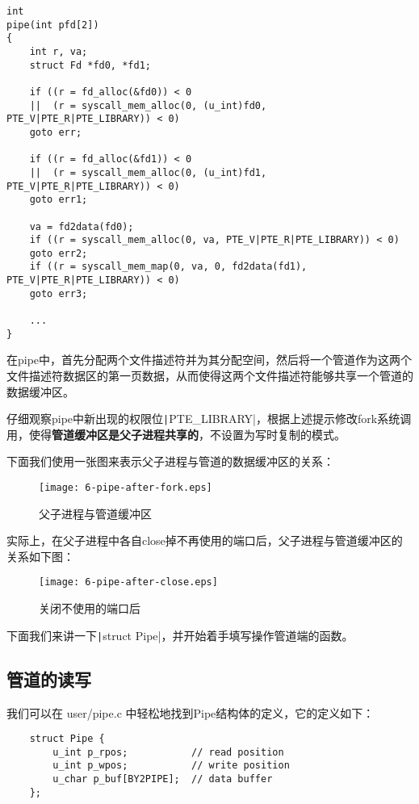 \begin{verbatim}
int
pipe(int pfd[2])
{
	int r, va;
	struct Fd *fd0, *fd1;
	
	if ((r = fd_alloc(&fd0)) < 0
	||  (r = syscall_mem_alloc(0, (u_int)fd0, PTE_V|PTE_R|PTE_LIBRARY)) < 0)
	goto err;
	
	if ((r = fd_alloc(&fd1)) < 0
	||  (r = syscall_mem_alloc(0, (u_int)fd1, PTE_V|PTE_R|PTE_LIBRARY)) < 0)
	goto err1;
	
	va = fd2data(fd0);
	if ((r = syscall_mem_alloc(0, va, PTE_V|PTE_R|PTE_LIBRARY)) < 0)
	goto err2;
	if ((r = syscall_mem_map(0, va, 0, fd2data(fd1), PTE_V|PTE_R|PTE_LIBRARY)) < 0)
	goto err3;
	
	...
}
\end{verbatim}

在pipe中，首先分配两个文件描述符并为其分配空间，然后将一个管道作为这两个文件描述符数据区的第一页数据，从而使得这两个文件描述符能够共享一个管道的数据缓冲区。

\begin{exercise}
	仔细观察pipe中新出现的权限位\texttt|PTE_LIBRARY|，根据上述提示修改fork系统调用，使得\textbf{管道缓冲区是父子进程共享的}，不设置为写时复制的模式。
\end{exercise}

下面我们使用一张图来表示父子进程与管道的数据缓冲区的关系：

\begin{figure}[htbp]
	\centering
	\texttt{[image: 6-pipe-after-fork.eps]}
	\caption{父子进程与管道缓冲区}\label{fig:6-pipe-after-fork} 
\end{figure}

实际上，在父子进程中各自close掉不再使用的端口后，父子进程与管道缓冲区的关系如下图：

\begin{figure}[htbp]
	\centering
	\texttt{[image: 6-pipe-after-close.eps]}
	\caption{关闭不使用的端口后}\label{fig:6-pipe-after-close} 
\end{figure}

下面我们来讲一下\texttt|struct Pipe|，并开始着手填写操作管道端的函数。

\subsection{管道的读写}

我们可以在 user/pipe.c 中轻松地找到Pipe结构体的定义，它的定义如下：

\begin{verbatim}
	struct Pipe {
		u_int p_rpos;		    // read position
		u_int p_wpos;		    // write position
		u_char p_buf[BY2PIPE];	// data buffer
	};
\end{verbatim}

